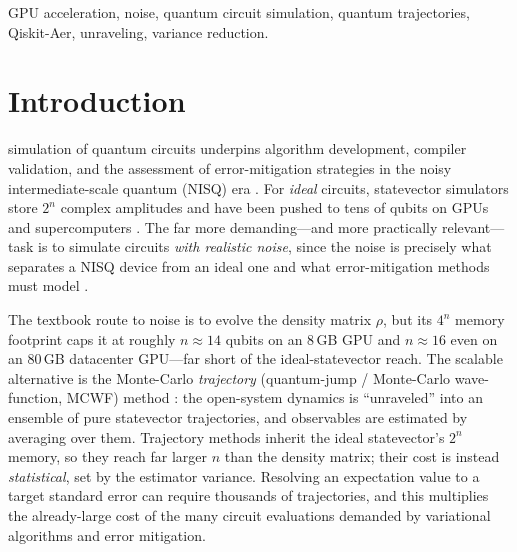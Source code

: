 \documentclass{ieeeaccess}
\begin{document}
\begin{keywords}
GPU acceleration, noise, quantum circuit simulation, quantum trajectories, Qiskit-Aer,
unraveling, variance reduction.
\end{keywords}

\titlepgskip=-15pt

\maketitle

\section{Introduction}
 simulation of quantum circuits underpins algorithm development,
compiler validation, and the assessment of error-mitigation strategies in the
noisy intermediate-scale quantum (NISQ) era \cite{preskill2018}. For \emph{ideal} circuits,
statevector simulators store $2^n$ complex amplitudes and have been pushed to tens of qubits
on GPUs and supercomputers \cite{haner2017,quest2019,intelqs2020,cuquantum2023,qiskit_aer}.
The far more demanding---and more practically relevant---task is to simulate circuits
\emph{with realistic noise}, since the noise is precisely what separates a NISQ device from
an ideal one and what error-mitigation methods must model
\cite{temme2017,sparse_pauli_lindblad2023}.

The textbook route to noise is to evolve the density matrix $\rho$, but its $4^n$ memory
footprint caps it at roughly $n\!\approx\!14$ qubits on an $8$\,GB GPU and $n\!\approx\!16$
even on an $80$\,GB datacenter GPU---far short of the ideal-statevector reach. The scalable
alternative is the Monte-Carlo \emph{trajectory} (quantum-jump / Monte-Carlo wave-function,
MCWF) method \cite{dalibard1992,molmer1993,plenio1998,breuer_petruccione,daley2014}: the
open-system dynamics is ``unraveled'' into an ensemble of pure statevector trajectories, and
observables are estimated by averaging over them. Trajectory methods inherit the ideal
statevector's $2^n$ memory, so they reach far larger $n$ than the density matrix; their cost
is instead \emph{statistical}, set by the estimator variance. Resolving an expectation value
to a target standard error can require thousands of trajectories, and this multiplies the
already-large cost of the many circuit evaluations demanded by variational algorithms and
error mitigation.
\end{document}
